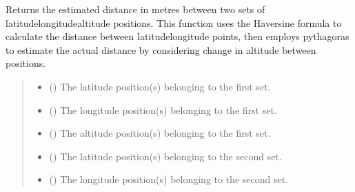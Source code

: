 \documentclass[letterpaper,10pt,english]{sphinxmanual}
\begin{document}
\begin{fulllineitems}
\pysigstopsignatures
\sphinxAtStartPar
Returns the estimated distance in metres between two sets of
latitude\sphinxhyphen{}longitude\sphinxhyphen{}altitude positions. This function uses the Haversine
formula to calculate the distance between latitude\sphinxhyphen{}longitude points, then
employs pythagoras to estimate the actual distance by considering change
in altitude between positions.
\begin{quote}\begin{description}
\begin{itemize}
\item {} 
\sphinxAtStartPar
{} (\sphinxstyleliteralemphasis{\sphinxupquote{ (}}\sphinxstyleliteralemphasis{\sphinxupquote{)}}) \textendash{} The latitude position(s) belonging to the first set.

\item {} 
\sphinxAtStartPar
{} (\sphinxstyleliteralemphasis{\sphinxupquote{ (}}\sphinxstyleliteralemphasis{\sphinxupquote{)}}) \textendash{} The longitude position(s) belonging to the first set.

\item {} 
\sphinxAtStartPar
{} (\sphinxstyleliteralemphasis{\sphinxupquote{ (}}\sphinxstyleliteralemphasis{\sphinxupquote{)}}) \textendash{} The altitude position(s) belonging to the first set.

\item {} 
\sphinxAtStartPar
{} (\sphinxstyleliteralemphasis{\sphinxupquote{ (}}\sphinxstyleliteralemphasis{\sphinxupquote{)}}) \textendash{} The latitude position(s) belonging to the second set.

\item {} 
\sphinxAtStartPar
{} (\sphinxstyleliteralemphasis{\sphinxupquote{ (}}\sphinxstyleliteralemphasis{\sphinxupquote{)}}) \textendash{} The longitude position(s) belonging to the second set.


\end{itemize}
\end{description}
\end{quote}
\end{fulllineitems}
\end{document}

